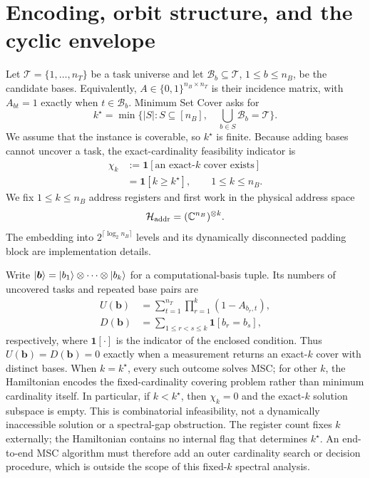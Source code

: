 \section{Encoding, orbit structure, and the cyclic envelope}
\label{sec:rewrite-framework}

Let $\mathcal T=\{1,\ldots,n_T\}$ be a task universe and let
$\mathcal B_b\subseteq\mathcal T$, $1\leq b\leq n_B$, be the candidate
bases.  Equivalently, $A\in\{0,1\}^{n_B\times n_T}$ is their incidence
matrix, with $A_{bt}=1$ exactly when $t\in\mathcal B_b$.  Minimum Set Cover
asks for
\begin{equation}
 k^\star=\min\bigl\{|S|:S\subseteq[n_B],\quad
 \textstyle\bigcup_{b\in S}\mathcal B_b=\mathcal T\bigr\}.
 \label{eq:msc-definition}
\end{equation}
We assume that the instance is coverable, so $k^\star$ is finite.  Because
adding bases cannot uncover a task, the exact-cardinality feasibility
indicator is
\[
 \begin{aligned}
 \chi_k&:=\mathbf 1[\text{an exact-$k$ cover exists}]\\
 &=\mathbf 1[k\geq k^\star],\qquad 1\leq k\leq n_B.
 \end{aligned}
\]
We fix $1\leq k\leq n_B$ address registers and first work in the physical
address space
\begin{equation}
 \mathcal H_{\rm addr}=(\mathbb C^{n_B})^{\otimes k}.
 \label{eq:addr-space-rewrite}
\end{equation}
The embedding into $2^{\lceil\log_2n_B\rceil}$ levels and its dynamically
disconnected padding block are implementation details.

Write $\lvert\boldsymbol b\rangle=\lvert b_1\rangle\otimes\cdots\otimes\lvert b_k\rangle$ for a
computational-basis tuple.  Its numbers of uncovered tasks and repeated
base pairs are
\begin{align}
 U(\boldsymbol b)
 &=\sum_{t=1}^{n_T}\prod_{r=1}^k(1-A_{b_r,t}),\\
 D(\boldsymbol b)
 &=\sum_{1\leq r<s\leq k}\mathbf 1[b_r=b_s],
\end{align}
respectively, where $\mathbf 1[\cdot]$ is the indicator of the enclosed
condition.  Thus $U(\boldsymbol b)=D(\boldsymbol b)=0$ exactly when a
measurement returns an exact-$k$ cover with distinct bases.  When
$k=k^\star$, every such outcome solves MSC; for other $k$, the Hamiltonian
encodes the fixed-cardinality covering problem rather than minimum
cardinality itself.  In particular, if $k<k^\star$, then $\chi_k=0$ and the
exact-$k$ solution subspace is empty.  This is combinatorial infeasibility,
not a dynamically inaccessible solution or a spectral-gap obstruction.  The
register count fixes $k$ externally; the Hamiltonian contains no internal
flag that determines $k^\star$.  An end-to-end MSC algorithm must therefore
add an outer cardinality search or decision procedure, which is outside the
scope of this fixed-$k$ spectral analysis.

